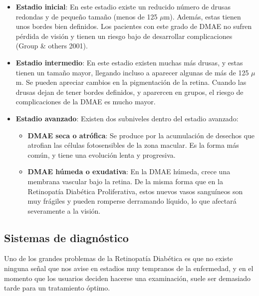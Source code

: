 \documentclass[
  12pt,
  spanish,
  a4paperpaper,
]{report}
\providecommand{\tightlist}{%
  \setlength{\itemsep}{0pt}\setlength{\parskip}{0pt}}
\begin{document}
\begin{itemize}
\tightlist
\item
  \textbf{Estadio inicial}: En este estadio existe un reducido número de
  drusas redondas y de pequeño tamaño (menos de 125 \(\mu\)m). Además,
  estas tienen unos bordes bien definidos. Los pacientes con este grado
  de DMAE no sufren pérdida de visión y tienen un riesgo bajo de
  desarrollar complicaciones (Group \& others 2001).
\item
  \textbf{Estadio intermedio}: En este estadio existen muchas más
  drusas, y estas tienen un tamaño mayor, llegando incluso a aparecer
  algunas de más de 125 \(\mu\)m. Se pueden apreciar cambios en la
  pigmentación de la retina. Cuando las drusas dejan de tener bordes
  definidos, y aparercen en grupos, el riesgo de complicaciones de la
  DMAE es mucho mayor.
\item
  \textbf{Estadio avanzado}: Existen dos subniveles dentro del estadio
  avanzado:

  \begin{itemize}
  \tightlist
  \item
    \textbf{DMAE seca o atrófica}: Se produce por la acumulación de
    desechos que atrofian las células fotosensibles de la zona macular.
    Es la forma más común, y tiene una evolución lenta y progresiva.
  \item
    \textbf{DMAE húmeda o exudativa}: En la DMAE húmeda, crece una
    membrana vascular bajo la retina. De la misma forma que en la
    Retinopatía Diabética Proliferativa, estos nuevos vasos sanguíneos
    son muy frágiles y pueden romperse derramando líquido, lo que
    afectará severamente a la visión.
  \end{itemize}
\end{itemize}

\hypertarget{sistemas-de-diagnuxf3stico}{%
\subsection{Sistemas de diagnóstico}\label{sistemas-de-diagnuxf3stico}}

Uno de los grandes problemas de la Retinopatía Diabética es que no
existe ninguna señal que nos avise en estadios muy tempranos de la
enfermedad, y en el momento que los usuarios deciden hacerse una
examinación, suele ser demasiado tarde para un tratamiento óptimo.
\end{document}

